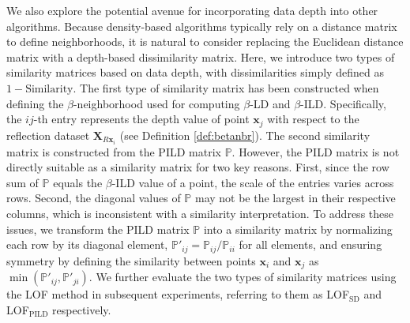\documentclass[final,3p,times]{elsarticle}
\newcommand{\vecx}{\mathbf{x}}
\newcommand{\vecX}{\mathbf{X}}
\begin{document}
We also explore the potential avenue for incorporating data depth into other algorithms. Because density-based algorithms typically rely on a distance matrix to define neighborhoods, it is natural to consider replacing the Euclidean distance matrix with a depth-based dissimilarity matrix. Here, we introduce two types of similarity matrices based on data depth, with dissimilarities simply defined as $1-\text{Similarity}$.
The first type of similarity matrix has been constructed when defining the $\beta$-neighborhood used for computing $\beta$-LD and $\beta$-ILD. Specifically, the $ij$-th entry represents the depth value of point $\vecx_j$ with respect to the reflection dataset $\vecX_{R\vecx_i}$ (see Definition \ref{def:betanbr}).
The second similarity matrix is constructed from the PILD matrix $\mathbb{P}$. However, the PILD matrix is not directly suitable as a similarity matrix for two key reasons. First, since the row sum of $\mathbb{P}$ equals the $\beta$-ILD value of a point, the scale of the entries varies across rows. Second, the diagonal values of $\mathbb{P}$ may not be the largest in their respective columns, which is inconsistent with a similarity interpretation. To address these issues, we transform the PILD matrix $\mathbb{P}$ into a similarity matrix by normalizing each row by its diagonal element, $\mathbb{P}'_{ij} = \mathbb{P}_{ij}/\mathbb{P}_{ii}$ for all elements, and ensuring symmetry by defining the similarity between points $\vecx_i$ and $\vecx_j$ as $ \min(\mathbb{P}'_{ij}, \mathbb{P}'_{ji})$. We further evaluate the two types of similarity matrices using the LOF method in subsequent experiments, referring to them as LOF$_{\text{SD}}$ and LOF$_{\text{PILD}}$ respectively.
\end{document}
